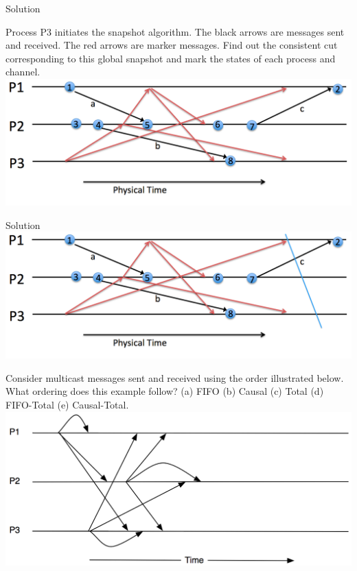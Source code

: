 \documentclass{article}
\begin{document}
\begin{spacing}{1.1}
\begin{homeworkProblem}
\begin{homeworkSection}{Solution}
	\end{homeworkSection}
\end{homeworkProblem}
\newpage
\begin{homeworkProblem}
	Process P3 initiates the snapshot algorithm. The black arrows are messages sent and received. The red arrows are marker messages. Find out the consistent cut corresponding to this global snapshot and mark the states of each process and channel.
	\\ \includegraphics[width=\linewidth]{prob4.png}
	\begin{homeworkSection}{Solution}
		\includegraphics[width=\linewidth]{prob4ans.png}
	\end{homeworkSection}
\end{homeworkProblem}
\newpage
\begin{homeworkProblem}
	Consider multicast messages sent and received using the order illustrated below. What ordering does this example follow? (a) FIFO (b) Causal (c) Total (d) FIFO-Total (e) Causal-Total.
	\\ \includegraphics[width=\linewidth]{prob5.png}

\end{homeworkProblem}
\end{spacing}
\end{document}
